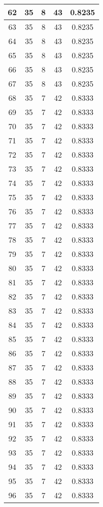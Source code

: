 \documentclass[letterpaper, 12pt]{article}
\begin{document}
\begin{longtable}{|c|c|c|c|c|}
\hline
62 & 35 & 8 & 43 & 0.8235 \\
\hline
63 & 35 & 8 & 43 & 0.8235 \\
\hline
64 & 35 & 8 & 43 & 0.8235 \\
\hline
65 & 35 & 8 & 43 & 0.8235 \\
\hline
66 & 35 & 8 & 43 & 0.8235 \\
\hline
67 & 35 & 8 & 43 & 0.8235 \\
\hline
68 & 35 & 7 & 42 & 0.8333 \\
\hline
69 & 35 & 7 & 42 & 0.8333 \\
\hline
70 & 35 & 7 & 42 & 0.8333 \\
\hline
71 & 35 & 7 & 42 & 0.8333 \\
\hline
72 & 35 & 7 & 42 & 0.8333 \\
\hline
73 & 35 & 7 & 42 & 0.8333 \\
\hline
74 & 35 & 7 & 42 & 0.8333 \\
\hline
75 & 35 & 7 & 42 & 0.8333 \\
\hline
76 & 35 & 7 & 42 & 0.8333 \\
\hline
77 & 35 & 7 & 42 & 0.8333 \\
\hline
78 & 35 & 7 & 42 & 0.8333 \\
\hline
79 & 35 & 7 & 42 & 0.8333 \\
\hline
80 & 35 & 7 & 42 & 0.8333 \\
\hline
81 & 35 & 7 & 42 & 0.8333 \\
\hline
82 & 35 & 7 & 42 & 0.8333 \\
\hline
83 & 35 & 7 & 42 & 0.8333 \\
\hline
84 & 35 & 7 & 42 & 0.8333 \\
\hline
85 & 35 & 7 & 42 & 0.8333 \\
\hline
86 & 35 & 7 & 42 & 0.8333 \\
\hline
87 & 35 & 7 & 42 & 0.8333 \\
\hline
88 & 35 & 7 & 42 & 0.8333 \\
\hline
89 & 35 & 7 & 42 & 0.8333 \\
\hline
90 & 35 & 7 & 42 & 0.8333 \\
\hline
91 & 35 & 7 & 42 & 0.8333 \\
\hline
92 & 35 & 7 & 42 & 0.8333 \\
\hline
93 & 35 & 7 & 42 & 0.8333 \\
\hline
94 & 35 & 7 & 42 & 0.8333 \\
\hline
95 & 35 & 7 & 42 & 0.8333 \\
\hline
96 & 35 & 7 & 42 & 0.8333 \\

\end{longtable}
\end{document}
